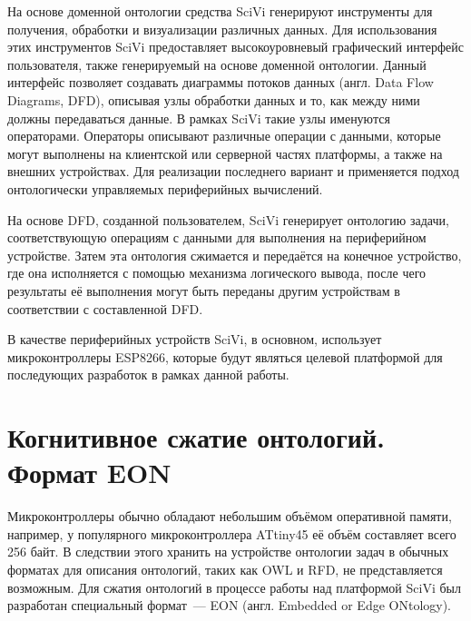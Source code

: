 На основе доменной онтологии средства SciVi генерируют инструменты для получения, обработки и визуализации различных данных.
Для использования этих инструментов SciVi предоставляет высокоуровневый графический интерфейс пользователя, также генерируемый на основе доменной онтологии.
Данный интерфейс позволяет создавать диаграммы потоков данных (англ. Data Flow Diagrams, DFD), описывая узлы обработки данных и то, как между ними должны передаваться данные.
В рамках SciVi такие узлы именуются операторами.
Операторы описывают различные операции с данными, которые могут выполнены на клиентской или серверной частях платформы, а также на внешних устройствах.
Для реализации последнего вариант и применяется подход онтологически управляемых периферийных вычислений.

На основе DFD, созданной пользователем, SciVi генерирует онтологию задачи, соответствующую операциям с данными для выполнения на периферийном устройстве.
Затем эта онтология сжимается и передаётся на конечное устройство, где она исполняется с помощью механизма логического вывода, после чего результаты её выполнения могут быть переданы другим устройствам в соответствии с составленной DFD.

В качестве периферийных устройств SciVi, в основном, использует микроконтроллеры ESP8266, которые будут являться целевой платформой для последующих разработок в рамках данной работы.

\section{Когнитивное сжатие онтологий. Формат EON}

Микроконтроллеры обычно обладают небольшим объёмом оперативной памяти, например, у популярного микроконтроллера ATtiny45 её объём составляет всего 256 байт.
В следствии этого хранить на устройстве онтологии задач в обычных форматах для описания онтологий, таких как OWL и RFD, не представляется возможным.
Для сжатия онтологий в процессе работы над платформой SciVi был разработан специальный формат~--- EON (англ. Embedded or Edge ONtology).

